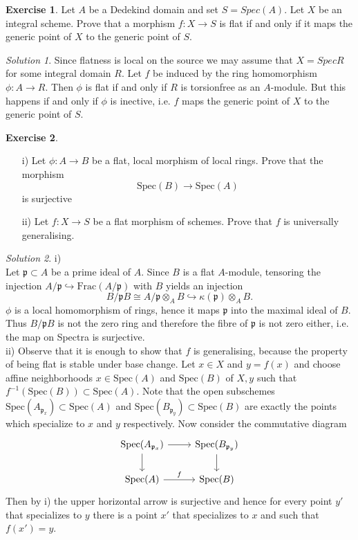 \documentclass[10pt]{article}
\author{Janos }
\theoremstyle{definition}
\newtheorem{exercise}{Exercise}
\theoremstyle{remark}
\newtheorem*{solution}{Solution}
\newcommand{\p}{\mathfrak{p}}
\newcommand{\Sp}{\text{Spec}}
\begin{document}
\setcounter{exercise}{0}
\begin{exercise}
Let $A$ be a Dedekind domain and set $ S = Spec (A)$. Let $X$ be an integral scheme. Prove that a morphism $f: X \rightarrow S$ is flat if and only if it maps the generic point of $X$ to the generic point of $S$.
\end{exercise}
\begin{solution}
Since flatness is local on the source we may assume that $X = Spec R$ for some integral domain $R$. Let $f$ be induced by the ring homomorphism $ \phi : A \rightarrow R$. Then $\phi$ is flat if and only if $R$ is torsionfree as an $A$-module. But this happens if and only if $\phi $ is inective, i.e. $f$ maps the generic point of $X$ to the generic point of $S$.
\end{solution}

\begin{exercise}

\begin{enumerate}
\item[i)] Let $\phi : A \rightarrow B$ be a flat, local morphism of local rings. Prove that the morphism $$\Sp (B) \rightarrow \Sp (A)$$
is surjective
\item[ii)] Let $f: X \rightarrow S$ be a flat morphism of schemes. Prove that $f$ is universally generalising.
\end{enumerate}
\end{exercise}
\begin{solution}
i) \\
Let $\p \subset A$ be a prime ideal of $A$. Since $B$ is a flat $A$-module, tensoring the injection $A / \p \hookrightarrow \text{Frac}(A / \p)$ with $B$ yields an injection 
$$B / \p B \cong A / \p \otimes_A B \hookrightarrow \kappa(  \p) \otimes_A B.$$
$\phi$ is a local homomorphism of rings, hence it maps $\p$ into the maximal ideal of $B$. Thus $B / \p B$ is not the zero ring and therefore the fibre of $\p$ is not zero either, i.e. the map on Spectra is surjective.\\
ii)
Observe that it is enough to show that $f$ is generalising, because the property of being flat is stable under base change.
Let $x \in X$ and $y= f(x)$ and choose affine neighborhoods $x\in \Sp (A)$ and $\Sp (B)$ of $X,y$ such that $f^{-1}(\Sp (B)) \subset \Sp (A)$. Note that the open subschemes $\Sp (A_{ \p _x}) \subset \Sp (A)$ and $\Sp(B_{\p _y}) \subset \Sp (B)$ are exactly the points which specialize to $x$ and $y$ respectively. Now consider the commutative diagram
\[
  \begin{tikzcd}
     \Sp (A_{ \p _x}) \arrow{r}{} \arrow[d] & \Sp(B_{\p _y}) \arrow[d] \\
      \Sp (A) \arrow{r}{f} & \Sp (B)
  \end{tikzcd}
\]
Then by i) the upper horizontal arrow is surjective and hence for every point $y'$ that specializes to $y$ there is a point $x'$ that specializes to $x$ and such that $f(x') = y$.
\end{solution}
\end{document}
